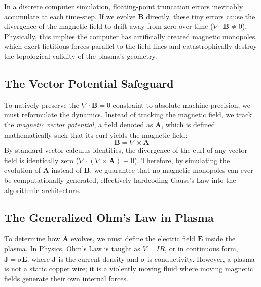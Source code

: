 \documentclass[11pt, a4paper]{article}
\begin{document}
In a discrete computer simulation, floating-point truncation errors inevitably accumulate at each time-step. If we evolve $\mathbf{B}$ directly, these tiny errors cause the divergence of the magnetic field to drift away from zero over time ($\nabla \cdot \mathbf{B} \neq 0$). Physically, this implies the computer has artificially created magnetic monopoles, which exert fictitious forces parallel to the field lines and catastrophically destroy the topological validity of the plasma's geometry.

\subsection{The Vector Potential Safeguard}
To natively preserve the $\nabla \cdot \mathbf{B} = 0$ constraint to absolute machine precision, we must reformulate the dynamics. Instead of tracking the magnetic field, we track the \textit{magnetic vector potential}, a field denoted as $\mathbf{A}$, which is defined mathematically such that its curl yields the magnetic field:
\begin{equation}
    \mathbf{B} = \nabla \times \mathbf{A}
\end{equation}
By standard vector calculus identities, the divergence of the curl of any vector field is identically zero ($\nabla \cdot (\nabla \times \mathbf{A}) \equiv 0$). Therefore, by simulating the evolution of $\mathbf{A}$ instead of $\mathbf{B}$, we guarantee that no magnetic monopoles can ever be computationally generated, effectively hardcoding Gauss's Law into the algorithmic architecture.

\subsection{The Generalized Ohm's Law in Plasma}
To determine how $\mathbf{A}$ evolves, we must define the electric field $\mathbf{E}$ inside the plasma. In Physics, Ohm's Law is taught as $V=IR$, or in continuous form, $\mathbf{J} = \sigma \mathbf{E}$, where $\mathbf{J}$ is the current density and $\sigma$ is conductivity. However, a plasma is not a static copper wire; it is a violently moving fluid where moving magnetic fields generate their own internal forces. 
\end{document}
